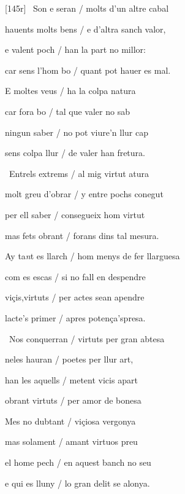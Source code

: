 \documentclass[12pt]{article}
\begin{document}
\begin{estrofa}

 [145r] \textparagraph\  Son e seran / molts d'un altre cabal

 hauents molts bens / e d'altra sanch valor,

 e valent poch / han la part no millor:

 car sens l'hom bo / quant pot hauer es mal.

 E moltes veus / ha la colpa natura

 car fora bo / tal que valer no sab

 ningun saber / no pot viure'n llur cap

 sens colpa llur / de valer han fretura.

\end{estrofa}



\begin{estrofa}

 \textparagraph\  Entrels extrems / al mig virtut atura

 molt greu d'obrar / y entre pochs conegut

 per ell saber / consegueix hom virtut

 mas fets obrant / forans dins tal mesura.

 Ay ta\textit{n}t es llarch / hom menys de fer llarguesa

 com es escas / si no fall en despendre

 vi\c{c}is,virtuts / per actes sean apendre

 lacte's primer / apres poten\c{c}a'spresa.

\end{estrofa}



\begin{estrofa}

 \textparagraph\  Nos conquerran / virtuts per gran abtesa

 neles hauran / poetes per llur art,

 han les aquells / metent vicis apart

 obrant virtuts / per amor de bonesa

 Mes no dubtant / vi\c{c}iosa vergonya

 mas solament / amant virtuos preu

 el home pech / en aquest banch no seu

 e qui es lluny / lo gran delit se alonya.

\end{estrofa}
\end{document}
